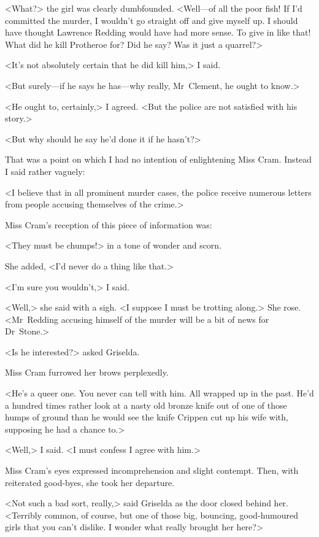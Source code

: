 <What?> the girl was clearly dumbfounded. <Well—of all the poor fish! If I'd committed the murder, I wouldn't go straight off and give myself up. I should have thought Lawrence Redding would have had more sense. To give in like that! What did he kill Protheroe for? Did he say? Was it just a quarrel?>

<It's not absolutely certain that he did kill him,> I said.

<But surely—if he says he has—why really, Mr~Clement, he ought to know.>

<He ought to, certainly,> I agreed. <But the police are not satisfied with his story.>

<But why should he say he'd done it if he hasn't?>

That was a point on which I had no intention of enlightening Miss Cram. Instead I said rather vaguely:

<I believe that in all prominent murder cases, the police receive numerous letters from people accusing themselves of the crime.>

Miss Cram's reception of this piece of information was:

<They must be chumps!> in a tone of wonder and scorn.

She added, <I'd never do a thing like that.>

<I'm sure you wouldn't,> I said.

<Well,> she said with a sigh. <I suppose I must be trotting along.> She rose. <Mr~Redding accusing himself of the murder will be a bit of news for Dr~Stone.>

<Is he interested?> asked Griselda.

Miss Cram furrowed her brows perplexedly.

<He's a queer one. You never can tell with him. All wrapped up in the past. He'd a hundred times rather look at a nasty old bronze knife out of one of those humps of ground than he would see the knife Crippen cut up his wife with, supposing he had a chance to.>

<Well,> I said. <I must confess I agree with him.>

Miss Cram's eyes expressed incomprehension and slight contempt. Then, with reiterated good-byes, she took her departure.

<Not such a bad sort, really,> said Griselda as the door closed behind her. <Terribly common, of course, but one of those big, bouncing, good-humoured girls that you can't dislike. I wonder what really brought her here?>

